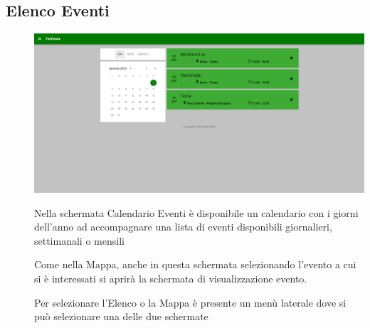 \documentclass{article}
\begin{document}
\subsection{Elenco Eventi}
\begin{description}
    \item[] \begin{center}
            \includegraphics[scale=0.3]{Elenco_Eventi.png}
        \end{center}
    \item[] Nella schermata Calendario Eventi è disponibile un calendario con i giorni dell'anno ad accompagnare una lista di eventi disponibili giornalieri, settimanali o mensili
    \item[] Come nella Mappa, anche in questa schermata selezionando l'evento a cui si è interessati si aprirà la schermata di visualizzazione evento.
    \item[] Per selezionare l'Elenco o la Mappa è presente un menù laterale dove si può selezionare una delle due schermate
\end{description}
\clearpage
\end{document}
